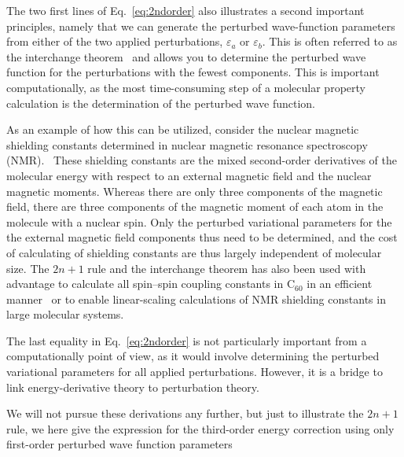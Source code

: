 \documentclass[%
 reprint,
 amsmath,amssymb,
 aps,
]{revtex4-1}
\begin{document}
The two first lines of Eq.~\eqref{eq:2ndorder} also illustrates a second
important principles, namely that we can generate the perturbed wave-function
parameters from either of the two applied perturbations, $\varepsilon_a$ or
$\varepsilon_b$. This is often referred to as the interchange
theorem~\cite{Interchange} and allows you to determine the perturbed wave
function for the perturbations with the fewest components. This is important
computationally, as the most time-consuming step of a molecular property
calculation is the determination of the perturbed wave function.

As an example of how this can be utilized, consider the nuclear magnetic
shielding constants determined in nuclear magnetic resonance spectroscopy
(NMR).~\cite{ChemRev1999,ChemRev2012} These shielding constants are the mixed
second-order derivatives of the molecular energy with respect to an external
magnetic field and the nuclear magnetic moments. Whereas there are only three
components of the magnetic field, there are three components of the magnetic
moment of each atom in the molecule with a nuclear spin. Only the perturbed
variational parameters for the the external magnetic field components thus need
to be determined, and the cost of calculating of shielding constants are thus
largely independent of molecular size. The $2n+1$ rule and the interchange
theorem has also been used with advantage to calculate all spin--spin coupling
constants in C$_{60}$ in an efficient manner~\cite{JaszunskiC60} or to enable
linear-scaling calculations of NMR shielding constants in large molecular
systems.~\cite{Ochsenfeld}

The last equality in Eq.~\eqref{eq:2ndorder} is not particularly important from
a computationally point of view, as it would involve determining the perturbed
variational parameters for all applied perturbations. However, it is a bridge
to link energy-derivative theory to perturbation theory.

We will not pursue these derivations any further, but just to illustrate the
$2n+1$ rule, we here give the expression for the third-order energy correction
using only first-order perturbed wave function parameters
\end{document}
